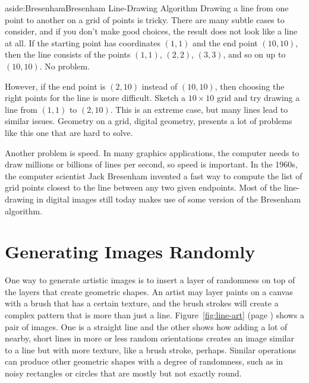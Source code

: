 \begin{aside}{aside:Bresenham}{Bresenham Line-Drawing Algorithm}
Drawing a line from one point to another on a grid of points is tricky.
There are many subtle cases to consider, and
if you don't make good choices, the result does not look
like a line at all. If the starting point has
coordinates $(1,1)$ and the end point $(10,10)$,
then the line consists of the points $(1,1)$,
$(2,2)$, $(3,3)$, and so on up to $(10,10)$.
No problem.

However, if the end point is $(2,10)$ instead of $(10,10)$,
then choosing the right points for the line is more difficult.
Sketch a $10\times10$ grid and try drawing a line
from  $(1,1)$ to  $(2,10)$.
This is an extreme case, but many lines lead to similar issues.
Geometry on a grid,
digital geometry,
presents a lot of problems like this one that are hard to solve.

Another problem is speed. In many graphics applications, the
computer needs to draw millions or billions of lines per second,
so speed is important.
In the 1960s, the computer scientist
Jack Bresenham invented
a fast way to compute the list of grid points closest to the line
between any two given endpoints.
Most of the line-drawing in digital images still today
makes use of some version of the Bresenham algorithm.
\end{aside}

\section{Generating Images Randomly}

One way to generate artistic images is to insert a layer of
randomness on top of the layers that create geometric shapes.
An artist may layer paints on a canvas
with a brush that has a certain texture, and the brush strokes
will create a complex pattern that is more than just a line.
Figure~\ref{fig:line-art} (page \pageref{fig:line-art})
shows a pair of images.
One is a straight line
and the other shows how adding a lot of nearby, short lines in
more or less random orientations
creates an image similar to a line but with more texture,
like a brush stroke, perhaps.
Similar operations can produce
other geometric shapes with a degree of randomness,
such as in noisy rectangles or circles that are
mostly but not exactly round.

